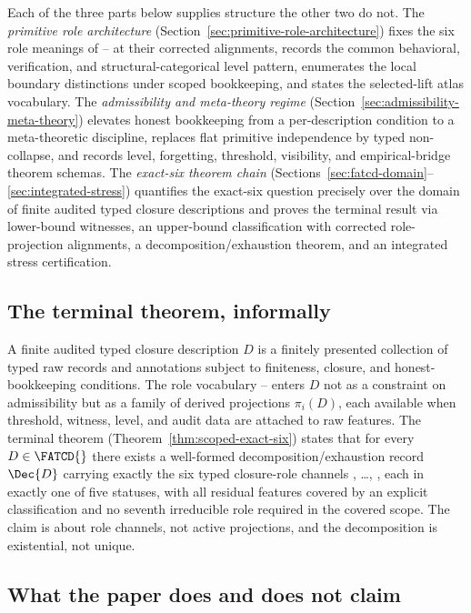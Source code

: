 Each of the three parts below supplies structure the other two do not.
The \emph{primitive role architecture}
(Section~\ref{sec:primitive-role-architecture}) fixes the six role
meanings of \Pone{}--\Psix{} at their corrected alignments, records
the common behavioral, verification, and structural-categorical level
pattern, enumerates the local boundary distinctions under scoped
bookkeeping, and states the selected-lift atlas vocabulary. The
\emph{admissibility and meta-theory regime}
(Section~\ref{sec:admissibility-meta-theory}) elevates honest
bookkeeping from a per-description condition to a meta-theoretic
discipline, replaces flat primitive independence by typed
non-collapse, and records level, forgetting, threshold, visibility,
and empirical-bridge theorem schemas. The \emph{exact-six theorem
chain}
(Sections~\ref{sec:fatcd-domain}--\ref{sec:integrated-stress})
quantifies the exact-six question precisely over the domain \FATCD{}
of finite audited typed closure descriptions and proves the terminal
result via lower-bound witnesses, an upper-bound classification with
corrected role-projection alignments, a decomposition/exhaustion
theorem, and an integrated stress certification.

\subsection{The terminal theorem, informally}\label{subsec:terminal-informal}

A finite audited typed closure description \(D\) is a finitely
presented collection of typed raw records and annotations subject to
finiteness, closure, and honest-bookkeeping conditions. The role
vocabulary \Pone{}--\Psix{} enters \(D\) not as a constraint on
admissibility but as a family of derived projections \(\pi_i(D)\),
each available when threshold, witness, level, and audit data are
attached to raw features. The terminal theorem
(Theorem~\ref{thm:scoped-exact-six}) states that for every
\(D \in \FATCD{}\) there exists a well-formed
decomposition/exhaustion record \(\Dec{D}\) carrying exactly the six
typed closure-role channels \Pone{}, \ldots, \Psix{}, each in exactly
one of five statuses, with all residual features covered by an
explicit classification and no seventh irreducible role required in
the covered scope. The claim is about role channels, not active
projections, and the decomposition is existential, not unique.

\subsection{What the paper does and does not claim}\label{subsec:intro-nonclaims}

